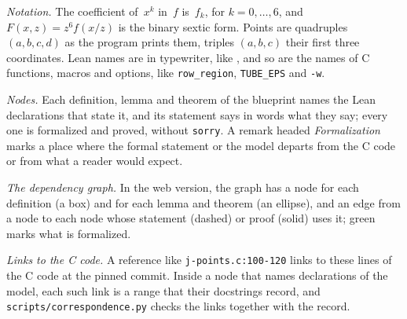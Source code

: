 \emph{Notation.} The coefficient of~$x^k$ in~$f$ is~$f_k$, for $k = 0, \dots, 6$, and $F(x, z) = z^6
f(x/z)$ is the binary sextic form. Points are quadruples $(a, b, c, d)$ as the program prints them,
triples $(a, b, c)$ their first three coordinates. Lean names are in typewriter, like
, and so are the names of C functions, macros and options, like
\texttt{row\_region}, \texttt{TUBE\_EPS} and \verb|-w|.

\emph{Nodes.} Each definition, lemma and theorem of the blueprint names the Lean declarations that
state it, and its statement says in words what they say; every one is formalized and proved, without
\verb|sorry|. A remark headed \emph{Formalization} marks a place where the formal statement or the
model departs from the C code or from what a reader would expect.

\emph{The dependency graph.} In the web version, the graph has a node for each definition (a box)
and for each lemma and theorem (an ellipse), and an edge from a node to each node whose statement
(dashed) or proof (solid) uses it; green marks what is formalized.

\emph{Links to the C code.} A reference like \texttt{j-points.c:100-120} links to these lines of the
C code at the pinned commit. Inside a node that names declarations of the model, each such link is a
range that their docstrings record, and \verb|scripts/correspondence.py| checks the links together
with the record.
